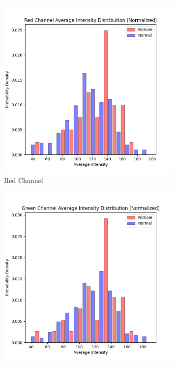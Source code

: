 \documentclass[a4paper, 10pt]{article}
\begin{document}
	\begin{figure}[htbp] 
		\centering 
		
		\begin{subfigure}{0.3\textwidth}
			\includegraphics[width=\linewidth]{picture/Red_distribution}
			\caption{Red Channel}
			\label{fig: Red Channel Histogram}	
		\end{subfigure}
		\begin{subfigure}{0.3\textwidth}
			\includegraphics[width=\linewidth]{picture/Green_distribution}

\end{subfigure}
\end{figure}
\end{document}
